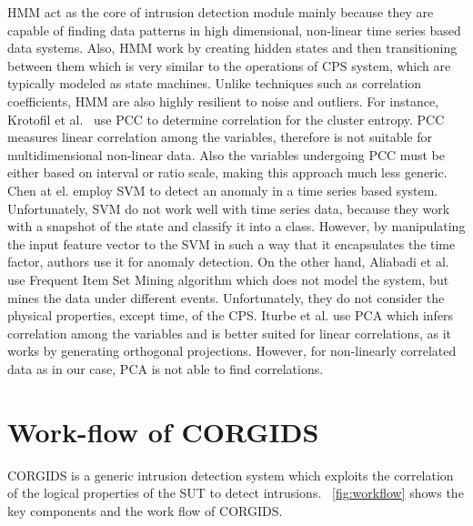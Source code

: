 \ac{HMM} act as the core of intrusion detection module mainly because they are capable of finding data patterns in high dimensional, non-linear time series based data systems. Also, \ac{HMM} work by creating hidden states and then transitioning between them which is very similar to the operations of \ac{CPS} system, which are typically modeled as state machines.
Unlike techniques such as correlation coefficients, \ac{HMM} are also highly resilient to noise and outliers. 
For instance, Krotofil et al.~\cite{krotofil2015process} use \acf{PCC} to determine correlation for the cluster entropy. \ac{PCC} measures linear correlation among the variables, therefore is not suitable for multidimensional non-linear data. Also the variables undergoing \ac{PCC} must be either based on interval or ratio scale, making this approach much less generic. Chen at el.  \cite{chen2018learning} employ \ac{SVM} to detect an anomaly in a time series based system. Unfortunately, \ac{SVM} do not work well with time series data, because they work with a snapshot of the state and classify it into a class. However, by manipulating the input feature vector to the \ac{SVM} in such a way that it encapsulates the time factor, authors use it for anomaly detection. On the other hand, Aliabadi et al. ~\cite{aliabadi2017artinali} use Frequent Item Set Mining algorithm which does not model the system, but mines the data under different events. Unfortunately, they do not consider the physical properties, except time, of the \ac{CPS}. Iturbe et al. \cite{iturbe2017feasibility} use \ac{PCA} which infers correlation among the variables and is better suited for linear correlations, as it works by generating orthogonal projections. However, for non-linearly correlated data as in our case, \ac{PCA} is not able to find correlations.

\section{Work-flow of CORGIDS}
\ac{CORGIDS} is a generic intrusion detection system which exploits the correlation of the logical properties of the \ac{SUT} to detect intrusions. ~\autoref{fig:workflow} shows the key components and the work flow of \ac{CORGIDS}.


